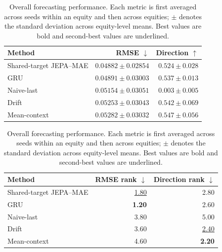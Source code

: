 \begin{table}[t]
\centering
\small
\caption{Overall forecasting performance. Each metric is first averaged across seeds within an equity and then across equities; $\pm$ denotes the standard deviation across equity-level means. Best values are bold and second-best values are underlined.}
\label{tab:main_metrics}
\begin{tabular}{lrr}
\toprule
Method & RMSE $\downarrow$ & Direction $\uparrow$ \\
\midrule
Shared-target JEPA--MAE & \textbf{$0.04882 \pm 0.02854$} & $0.524 \pm 0.028$ \\
GRU & \underline{$0.04891 \pm 0.03003$} & $0.537 \pm 0.013$ \\
Naive-last & $0.05154 \pm 0.03051$ & $0.003 \pm 0.005$ \\
Drift & $0.05253 \pm 0.03043$ & \underline{$0.542 \pm 0.069$} \\
Mean-context & $0.05282 \pm 0.03032$ & \textbf{$0.547 \pm 0.056$} \\
\bottomrule
\end{tabular}
\par\medskip
\begin{tabular}{lrr}
\toprule
Method & RMSE rank $\downarrow$ & Direction rank $\downarrow$ \\
\midrule
Shared-target JEPA--MAE & \underline{1.80} & 2.80 \\
GRU & \textbf{1.20} & 2.60 \\
Naive-last & 3.80 & 5.00 \\
Drift & 3.60 & \underline{2.40} \\
Mean-context & 4.60 & \textbf{2.20} \\
\bottomrule
\end{tabular}
\end{table}

